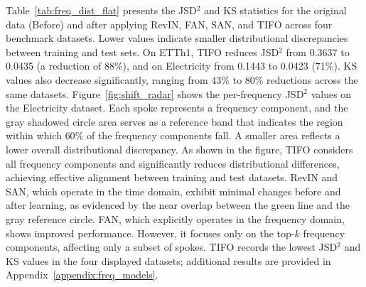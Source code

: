 \documentclass[sigconf,anonymous,review]{acmart}
\newcommand{\methodn}{\textsc{TIFO}}
\newcommand{\method}{\textsc{\methodn}\xspace}
\begin{document}
Table~\ref{tab:freq_dist_flat} presents the JSD$^2$ and KS statistics for the original data (Before) and after applying RevIN, FAN, SAN, and \method across four benchmark datasets.
Lower values indicate smaller distributional discrepancies between training and test sets.
On ETTh1, \method reduces JSD$^2$ from 0.3637 to 0.0435 (a reduction of 88\%), and on Electricity from 0.1443 to 0.0423 (71\%). 
KS values also decrease significantly, ranging from 43\% to 80\% reductions across the same datasets.
Figure~\ref{fig:shift_radar} shows the per-frequency JSD$^2$ values on the Electricity dataset. 
Each spoke represents a frequency component, and the gray shadowed circle area serves as a reference band that indicates the region within which $60\%$ of the frequency components fall.
A smaller area reflects a lower overall distributional discrepancy.
As shown in the figure, \method considers all frequency components and significantly reduces distributional differences, achieving effective alignment between training and test datasets.
RevIN and SAN, which operate in the time domain, 
exhibit minimal changes before and after learning, as evidenced by the near overlap between the green line and the gray reference circle.
FAN, which explicitly operates in the frequency domain, shows improved performance. 
However, it focuses only on the top-$k$ frequency components, affecting only a subset of spokes.  
\method records the lowest JSD$^2$ and KS values in the four displayed
datasets; additional results are provided in Appendix~\ref {appendix:freq_models}.


\end{document}
